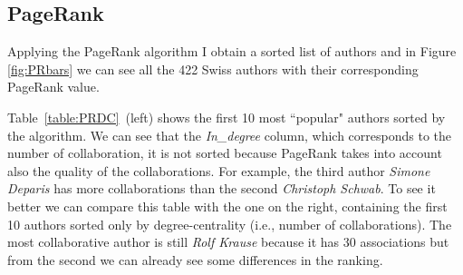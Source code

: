 \documentclass[]{usiinfbachelorproject}
\begin{document}
\subsection{PageRank}
Applying the PageRank algorithm I obtain a sorted list of authors and in Figure \ref{fig:PRbars} we can see all the 422 Swiss authors with their corresponding PageRank value. 

Table~\ref{table:PRDC}~(left) shows the first 10 most ``popular" authors sorted by the algorithm.
We can see that the \textit{In\_degree} column, which corresponds to the number of collaboration, it is not sorted because PageRank takes into account also the quality of the collaborations.
For example, the third author \textit{Simone Deparis} has more collaborations than the second \textit{Christoph Schwab}.
To see it better we can compare this table with the one on the right, containing the first 10 authors sorted only by degree-centrality (i.e., number of collaborations). The most collaborative author is still \textit{Rolf Krause} because it has 30 associations but from the second we can already see some differences in the ranking.
\end{document}
